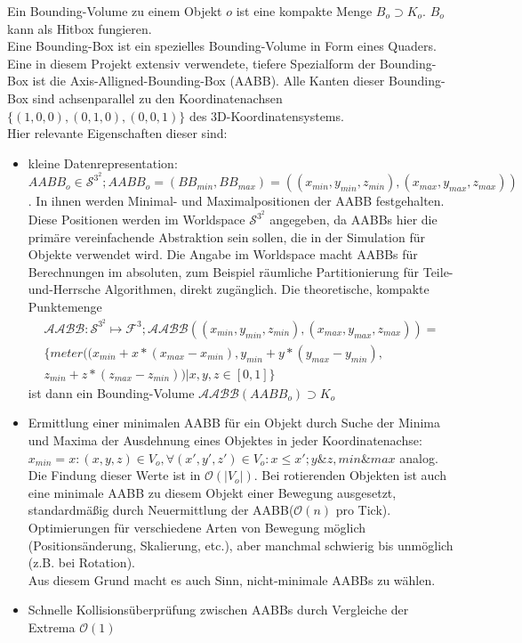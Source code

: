 Ein Bounding-Volume zu einem Objekt $o$ ist eine kompakte Menge $B_o \supset K_{o}$. $B_o$ kann als Hitbox fungieren.\\
Eine Bounding-Box ist ein spezielles Bounding-Volume in Form eines Quaders.\\
Eine in diesem Projekt extensiv verwendete, tiefere Spezialform der Bounding-Box ist die Axis-Alligned-Bounding-Box (AABB). Alle Kanten dieser Bounding-Box sind achsenparallel zu den Koordinatenachsen $\{(1,0,0), (0,1,0), (0,0,1)\}$ des 3D-Koordinatensystems.\\
Hier relevante Eigenschaften dieser sind:
\begin{itemize}
\item kleine Datenrepresentation:
		$$AABB_o \in \mathcal{S}^{3^2}; AABB_o = (BB_{min}, BB_{max}) = ((x_{min}, y_{min}, z_{min}), (x_{max}, y_{max}, z_{max}))$$.
		 In ihnen werden Minimal- und Maximalpositionen der AABB festgehalten.
		 Diese Positionen werden im Worldspace $\mathcal{S}^{3^2}$ angegeben, da AABBs hier die primäre vereinfachende Abstraktion sein sollen, die in der Simulation für Objekte verwendet wird. Die Angabe im Worldspace macht AABBs für Berechnungen im absoluten, zum Beispiel räumliche Partitionierung für Teile-und-Herrsche Algorithmen, direkt zugänglich.
		 Die theoretische, kompakte Punktemenge 
		 \begin{align*}
		 \mathcal{AABB}: \mathcal{S}^{3^2} \mapsto \mathcal{F}^3;
		 \mathcal{AABB} ((x_{min}, y_{min}, z_{min}), (x_{max}, y_{max}, z_{max})) = \\
		 \{meter((x_{min} + x * (x_{max} - x_{min}), y_{min} + y * (y_{max} - y_{min}),\\
		  z_{min} + z * (z_{max} - z_{min}))| x, y, z \in [0,1] \} 
		 \end{align*}
		 ist dann ein Bounding-Volume $\mathcal{AABB}(AABB_o) \supset K_o$
	\item Ermittlung einer minimalen AABB für ein Objekt durch Suche der Minima und Maxima der Ausdehnung eines Objektes in jeder Koordinatenachse:
	 $x_{min} = x : (x, y, z) \in V_o , \forall (x', y', z') \in V_o: x \leq x'; y \& z, min \& max $ analog.
	 Die Findung dieser Werte ist in $ \mathcal{O}(|V_o|) $.
		Bei rotierenden Objekten ist auch eine minimale AABB zu diesem Objekt einer Bewegung ausgesetzt, standardmäßig durch Neuermittlung der AABB($\mathcal{O}(n)$ pro Tick). Optimierungen für verschiedene Arten von Bewegung möglich (Positionsänderung, Skalierung, etc.), aber manchmal schwierig bis unmöglich (z.B. bei Rotation).\\
		Aus diesem Grund macht es auch Sinn, nicht-minimale AABBs zu wählen.
	\item Schnelle Kollisionsüberprüfung zwischen AABBs durch Vergleiche der Extrema $\mathcal{O}(1)$
\end{itemize}

